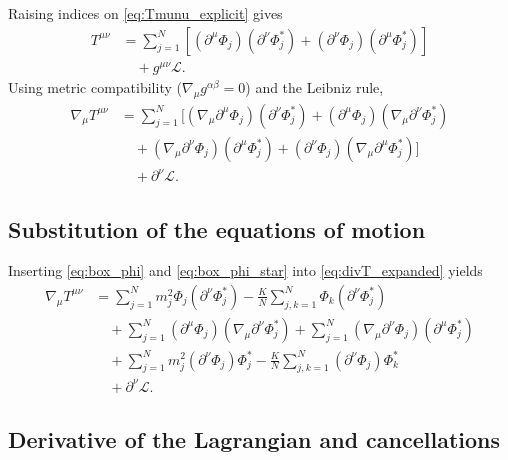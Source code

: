 Raising indices on \eqref{eq:Tmunu_explicit} gives
\begin{equation}
\begin{aligned}
T^{\mu\nu}
&=\sum_{j=1}^N\left[(\partial^\mu\Phi_j)(\partial^\nu\Phi_j^*)
+(\partial^\nu\Phi_j)(\partial^\mu\Phi_j^*)\right] \\
&\quad+g^{\mu\nu}\mathcal{L} .
\end{aligned}
\end{equation}
Using metric compatibility ($\nabla_\mu g^{\alpha\beta}=0$) and the Leibniz rule,
\begin{align}
\nabla_\mu T^{\mu\nu}
&=\sum_{j=1}^N\Big[(\nabla_\mu\partial^\mu\Phi_j)(\partial^\nu\Phi_j^*)
+(\partial^\mu\Phi_j)(\nabla_\mu\partial^\nu\Phi_j^*) \nonumber\\
&\quad+(\nabla_\mu\partial^\nu\Phi_j)(\partial^\mu\Phi_j^*)
+(\partial^\nu\Phi_j)(\nabla_\mu\partial^\mu\Phi_j^*)\Big] \nonumber\\
&\quad+\partial^\nu\mathcal{L} .
\label{eq:divT_expanded}
\end{align}

\subsection{Substitution of the equations of motion}

Inserting \eqref{eq:box_phi} and \eqref{eq:box_phi_star} into \eqref{eq:divT_expanded} yields
\begin{align}
\nabla_\mu T^{\mu\nu}
&=\sum_{j=1}^N m_j^2\Phi_j(\partial^\nu\Phi_j^*)
-\frac{K}{N}\sum_{j,k=1}^N\Phi_k(\partial^\nu\Phi_j^*) \nonumber\\
&\quad+\sum_{j=1}^N(\partial^\mu\Phi_j)(\nabla_\mu\partial^\nu\Phi_j^*)
+\sum_{j=1}^N(\nabla_\mu\partial^\nu\Phi_j)(\partial^\mu\Phi_j^*) \nonumber\\
&\quad+\sum_{j=1}^N m_j^2(\partial^\nu\Phi_j)\Phi_j^*
-\frac{K}{N}\sum_{j,k=1}^N(\partial^\nu\Phi_j)\Phi_k^* \nonumber\\
&\quad+\partial^\nu\mathcal{L} .
\label{eq:divT_substituted}
\end{align}

\subsection{Derivative of the Lagrangian and cancellations}

